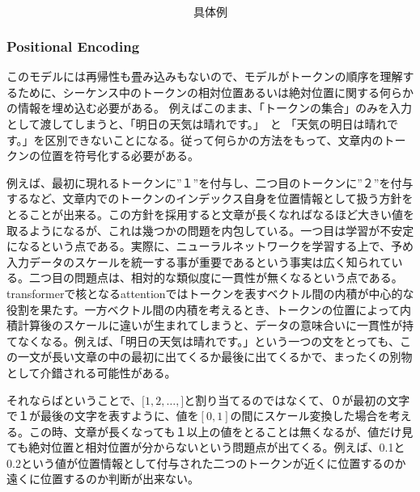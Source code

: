 \begin{equation*}
  \text{具体例}
\end{equation*}


\subsubsection{Positional Encoding}



このモデルには再帰性も畳み込みもないので、モデルがトークンの順序を理解するために、シーケンス中のトークンの相対位置あるいは絶対位置に関する何らかの情報を埋め込む必要がある。
例えばこのまま、「トークンの集合」のみを入力として渡してしまうと、「明日の天気は晴れです。」　と 「天気の明日は晴れです。」を区別できないことになる。従って何らかの方法をもって、文章内のトークンの位置を符号化する必要がある。

例えば、最初に現れるトークンに”１”を付与し、二つ目のトークンに”２”を付与するなど、文章内でのトークンのインデックス自身を位置情報として扱う方針をとることが出来る。この方針を採用すると文章が長くなればなるほど大きい値を取るようになるが、これは幾つかの問題を内包している。一つ目は学習が不安定になるという点である。実際に、ニューラルネットワークを学習する上で、予め入力データのスケールを統一する事が重要であるという事実は広く知られている。二つ目の問題点は、相対的な類似度に一貫性が無くなるという点である。transformerで核となるattentionではトークンを表すベクトル間の内積が中心的な役割を果たす。一方ベクトル間の内積を考えるとき、トークンの位置によって内積計算後のスケールに違いが生まれてしまうと、データの意味合いに一貫性が持てなくなる。例えば、「明日の天気は晴れです。」という一つの文をとっても、この一文が長い文章の中の最初に出てくるか最後に出てくるかで、まったくの別物として介錯される可能性がある。

それならばということで、$\lbrack1, 2, \ldots, \rbrack$と割り当てるのではなくて、０が最初の文字で１が最後の文字を表すように、値を$[0, 1]$の間にスケール変換した場合を考える。この時、文章が長くなっても１以上の値をとることは無くなるが、値だけ見ても絶対位置と相対位置が分からないという問題点が出てくる。例えば、0.1と0.2という値が位置情報として付与された二つのトークンが近くに位置するのか遠くに位置するのか判断が出来ない。

